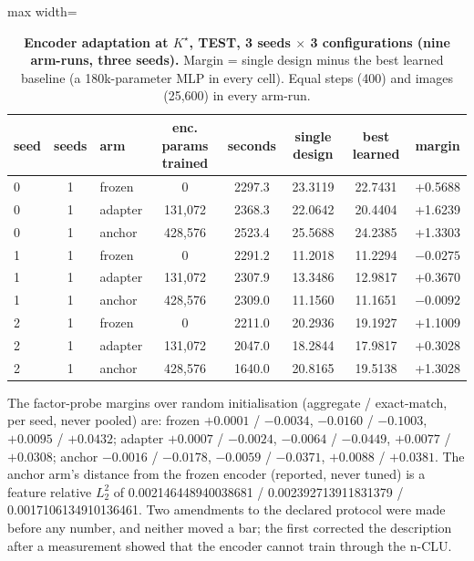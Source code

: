 \documentclass{article} %
\newcommand{\Kstar}{\ensuremath{K^{\star}}}
\begin{document}
\begin{table}[h]
\centering\small
\caption{\textbf{Encoder adaptation at $\Kstar$, TEST, 3 seeds $\times$ 3 configurations (nine
arm-runs, three seeds).} Margin = single design minus the best learned baseline (a 180k-parameter %
MLP in every cell). Equal steps (400) and images (25,600) in every arm-run.} %
\label{tab:adapt}
\setlength{\tabcolsep}{3pt}
\begin{adjustbox}{max width=\linewidth}\begin{tabular}{lclccccc}
\toprule
seed & seeds & arm & enc. params trained & seconds & single design & best learned & margin \\
\midrule
0 & 1 & frozen & 0 & 2297.3 & 23.3119 & 22.7431 & +0.5688 \\
0 & 1 & adapter & 131,072 & 2368.3 & 22.0642 & 20.4404 & +1.6239 \\
0 & 1 & anchor & 428,576 & 2523.4 & 25.5688 & 24.2385 & +1.3303 \\
1 & 1 & frozen & 0 & 2291.2 & 11.2018 & 11.2294 & $-0.0275$ \\
1 & 1 & adapter & 131,072 & 2307.9 & 13.3486 & 12.9817 & +0.3670 \\
1 & 1 & anchor & 428,576 & 2309.0 & 11.1560 & 11.1651 & $-0.0092$ \\
2 & 1 & frozen & 0 & 2211.0 & 20.2936 & 19.1927 & +1.1009 \\
2 & 1 & adapter & 131,072 & 2047.0 & 18.2844 & 17.9817 & +0.3028 \\
2 & 1 & anchor & 428,576 & 1640.0 & 20.8165 & 19.5138 & +1.3028 \\
\bottomrule
\end{tabular}\end{adjustbox}
\end{table}

\noindent The factor-probe margins over random initialisation (aggregate / exact-match, per seed,
never pooled) are: frozen $+0.0001$ / $-0.0034$, $-0.0160$ / $-0.1003$, $+0.0095$ / $+0.0432$; adapter
$+0.0007$ / $-0.0024$, $-0.0064$ / $-0.0449$, $+0.0077$ / $+0.0308$; anchor $-0.0016$ / $-0.0178$,
$-0.0059$ / $-0.0371$, $+0.0088$ / $+0.0381$. The anchor arm's distance from the frozen encoder
(reported, never tuned) is a feature relative $L_2^2$ of 0.002146448940038681 / 0.002392713911831379 /
0.0017106134910136461. %
Two amendments to the declared protocol were made before any number, and neither moved a bar; the first
corrected the description after a measurement showed that the encoder cannot train through the
n-CLU. %
\end{document}
